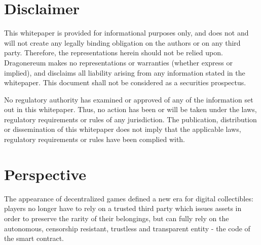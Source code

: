 \documentclass[12pt]{article}
\begin{document}
\newpage
\par


\vspace{\baselineskip}



\tableofcontents

\vspace{\baselineskip}

\newpage
\vspace{\baselineskip}\section*{Disclaimer}
This whitepaper is provided for informational purposes only, and does not and will not create any legally binding obligation on the authors or on any third party. Therefore, the representations herein should not be relied upon. Dragonereum makes no representations or warranties (whether express or implied), and disclaims all liability arising from any information stated in the whitepaper. This document shall not be considered as a securities prospectus. \par

No regulatory authority has examined or approved of any of the information set out in this whitepaper. Thus, no action has been or will be taken under the laws, regulatory requirements or rules of any jurisdiction. The publication, distribution or dissemination of this whitepaper does not imply that the applicable laws, regulatory requirements or rules have been complied with.\par


\vspace{\baselineskip}



\newpage

\vspace{\baselineskip}\section{Perspective}
The appearance of decentralized games defined a new era for digital collectibles: players no longer have to rely on a trusted third party which issues assets in order to preserve the rarity of their belongings, but can fully rely on the autonomous, censorship resistant, trustless and transparent entity - the code of the smart contract.\par
\end{document}
